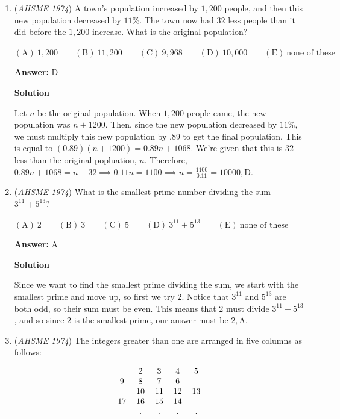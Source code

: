 \begin{enumerate}
	\item (\textit{AHSME 1974}) A town's population increased by $1,200$ people, and then this new population decreased by $11\%$. The town now had $32$ less people than it did before the $1,200$ increase. What is the original population?


 $\mathrm{(A)\ } 1,200 \qquad \mathrm{(B) \ }11,200 \qquad \mathrm{(C) \  } 9,968 \qquad \mathrm{(D) \  } 10,000 \qquad \mathrm{(E) \  }\text{none of these}$

 \textbf{Answer: }D



\textbf{Solution}

Let $n$ be the original population. When $1,200$ people came, the new population was $n+1200$. Then, since the new population decreased by $11\%$, we must multiply this new population by $.89$ to get the final population. This is equal to $(0.89)(n+1200)=0.89n+1068$. We're given that this is $32$ less than the original popluation, $n$. Therefore, $0.89n+1068=n-32\implies 0.11n=1100\implies n=\frac{1100}{0.11}=10000, \boxed{\text{D}}$.

 


	\item (\textit{AHSME 1974}) What is the smallest prime number dividing the sum $3^{11}+5^{13}$?


 $\mathrm{(A)\ } 2 \qquad \mathrm{(B) \ }3 \qquad \mathrm{(C) \  } 5 \qquad \mathrm{(D) \  } 3^{11}+5^{13} \qquad \mathrm{(E) \  }\text{none of these}$

 \textbf{Answer: }A



\textbf{Solution}

Since we want to find the smallest prime dividing the sum, we start with the smallest prime and move up, so first we try $2$. Notice that $3^{11}$ and $5^{13}$ are both odd, so their sum must be even. This means that $2$ must divide $3^{11}+5^{13}$, and so since $2$ is the smallest prime, our answer must be $2, \boxed{\text{A}}$.

 


	\item (\textit{AHSME 1974}) The integers greater than one are arranged in five columns as follows:


 
 \[\begin{tabular}{c c c c c}\ & 2 & 3 & 4 & 5\\ 9 & 8 & 7 & 6 &\ \\ \ & 10 & 11 & 12 & 13\\ 17 & 16 & 15 & 14 &\ \\ \ & . & . & . & .\\ \end{tabular}\]



\end{enumerate}
